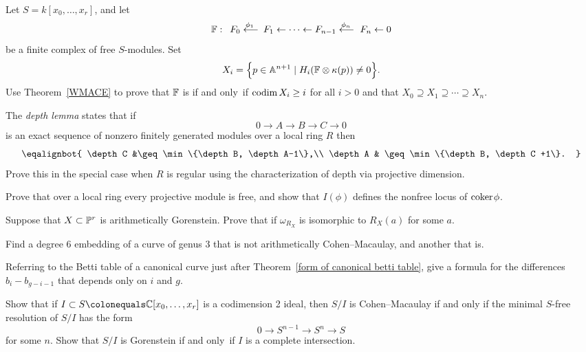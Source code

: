 \begin{exercise}\label{WMACE corollary}
Let $S = k[x_0,\dots, x_r]$, and let
$$
\FF:\quad  
F_0\luto{\phi_1}F_1 \leftarrow \cdots \leftarrow F_{n-1}\luto{\phi_n} F_n\leftarrow 0
$$
be a finite complex of free $S$-modules. Set
$$
X_i =\Big\{p\in \mathbb A^{n+1} \mid  H_i({\mathbb F} \otimes \kappa(p)) \neq 0 \Big\}.
$$
Use Theorem~\ref{WMACE} to prove that ${\mathbb F}$ is 
%
if and only~if
$
\operatorname{codim} X_i \geq i
$
for all $i>0$ and that $X_{0}\supseteq X_{1}\supseteq \cdots \supseteq
X_{n}$.
\end{exercise}

\begin{exercise}
The \emph{depth lemma} states that if
%
$$
0\to A\to B\to C \to 0
$$
is an exact sequence of nonzero finitely generated modules over a local
ring $R$ then
$$
\let\\\cr
\eqalignbot{
\depth C &\geq \min\{\depth B, \depth A-1\},\\
\depth A & \geq \min\{\depth B, \depth C +1\}.
}
$$
Prove this in the special case when $R$ is regular using the
characterization of depth
via projective dimension.
\end{exercise}

\begin{exercise}
 Prove that over a local ring every projective module is free,
and show that
$I(\phi)$ defines the nonfree locus of ${\rm{coker}\kern1pt} \phi$.
\end{exercise}

\begin{exercise} Suppose that $X\subset {\mathbb P}^{r}$ is arithmetically Gorenstein.
Prove that 
%
if $\omega_{R_{X}}$  is isomorphic to $R_{X}(a)$ for some
$a$. 
\end{exercise}

\begin{exercise}
Find a degree 6 embedding of a curve of genus 3 that is not arithmetically
Cohen--Macaulay, and another that is.
\end{exercise}

\begin{exercise}
Referring to the Betti table of a canonical curve just after Theorem~\ref{form of canonical betti table},
%
give a formula
for the differences $b_i- b_{g-i-1}$ that depends only on $i$ and $g$.
\end{exercise}

\begin{exercise}
Show that if $I \subset S \colonequals  \CC[x_0,\dots, x_r]$ is a
codimension 2 ideal, then $S/I$ is Cohen--Macaulay if and only
if the minimal $S$-free resolution of $S/I$ has the form
$$
0\to S^{n-1} \to S^n \to S
$$
for some $n$. Show that $S/I$ is Gorenstein if and only~if $I$ is a
complete intersection.
\end{exercise}

